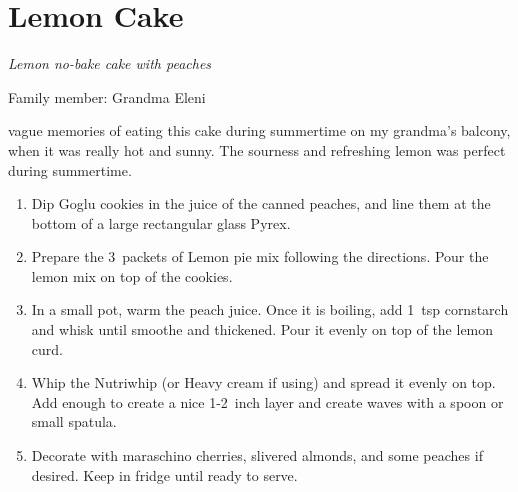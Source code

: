 \chapter{Lemon Cake}
\label{ch:Lemoncake}



\textit{Lemon no-bake cake with peaches}

Family member: Grandma Eleni

 vague memories of eating this cake during summertime on my grandma's balcony, when it was really hot and sunny. The sourness and refreshing lemon was perfect during summertime.

\begin{enumerate}
    \item Dip Goglu cookies in the juice of the canned peaches, and line them at the bottom of a large rectangular glass Pyrex.
    \item Prepare the 3~packets of Lemon pie mix following the directions. Pour the lemon mix on top of the cookies.
    \item In a small pot, warm the peach juice. Once it is boiling, add 1~tsp cornstarch and whisk until smoothe and thickened. Pour it evenly on top of the lemon curd.
    \item Whip the Nutriwhip (or Heavy cream if using) and spread it evenly on top. Add enough to create a nice 1-2~inch layer and create waves with a spoon or small spatula.
    \item Decorate with maraschino cherries, slivered almonds, and some peaches if desired. Keep in fridge until ready to serve.
\end{enumerate}

